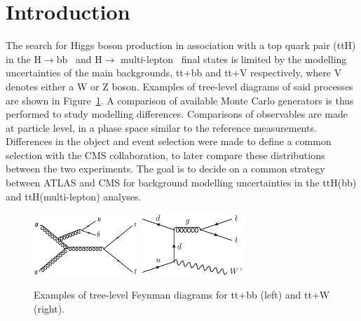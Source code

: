\section{Introduction}
\label{sec:intro}
The search for Higgs boson production in association with a top quark pair (ttH) in the $\mathrm{H\rightarrow bb}$~\cites{HIGG-2017-03} and $\mathrm{H\rightarrow}$ multi-lepton~\cite{ATLAS-CONF-2019-045} final states is limited by the modelling uncertainties of the main backgrounds, tt+bb and tt+V respectively, where V denotes either a W or Z boson. Examples of tree-level diagrams of said processes are shown in Figure~\ref{intro:sig}. A comparison of available Monte Carlo generators is thus performed to study modelling differences. Comparisons of observables are made at particle level, in a phase space similar to the reference measurements. Differences in the object and event selection were made to define a common selection with the CMS collaboration, to later compare these distributions between the two experiments. The goal is to decide on a common strategy between ATLAS and CMS for background modelling uncertainties in the ttH(bb) and ttH(multi-lepton) analyses.

\begin{figure}[!htb]
\centering
\includegraphics[width=0.35\textwidth]{Plots/ttbb/ttbb}
\includegraphics[width=0.35\textwidth]{Plots/ttV/ttW}
  \caption{Examples of tree-level Feynman diagrams for tt+bb (left) and tt+W (right). \label{intro:sig}}
\end{figure}